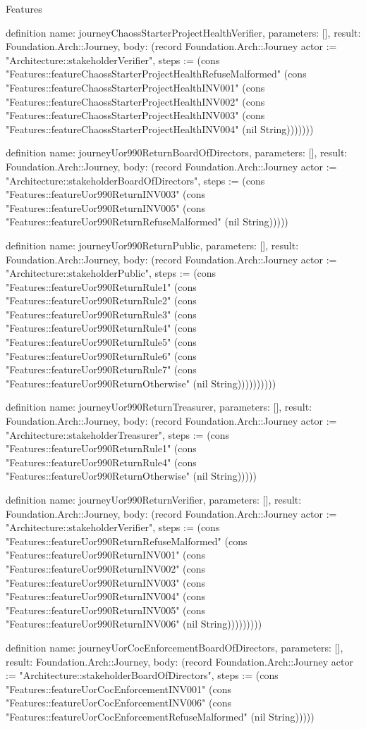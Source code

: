 \begin{lexlean}{Features}
\begin{semanticmodule}
definition{
  name: journeyChaossStarterProjectHealthVerifier,
  parameters: [],
  result: Foundation.Arch::Journey,
  body: (record Foundation.Arch::Journey {actor := "Architecture::stakeholderVerifier", steps := (cons "Features::featureChaossStarterProjectHealthRefuseMalformed" (cons "Features::featureChaossStarterProjectHealthINV001" (cons "Features::featureChaossStarterProjectHealthINV002" (cons "Features::featureChaossStarterProjectHealthINV003" (cons "Features::featureChaossStarterProjectHealthINV004" (nil String))))))})
}

definition{
  name: journeyUor990ReturnBoardOfDirectors,
  parameters: [],
  result: Foundation.Arch::Journey,
  body: (record Foundation.Arch::Journey {actor := "Architecture::stakeholderBoardOfDirectors", steps := (cons "Features::featureUor990ReturnINV003" (cons "Features::featureUor990ReturnINV005" (cons "Features::featureUor990ReturnRefuseMalformed" (nil String))))})
}

definition{
  name: journeyUor990ReturnPublic,
  parameters: [],
  result: Foundation.Arch::Journey,
  body: (record Foundation.Arch::Journey {actor := "Architecture::stakeholderPublic", steps := (cons "Features::featureUor990ReturnRule1" (cons "Features::featureUor990ReturnRule2" (cons "Features::featureUor990ReturnRule3" (cons "Features::featureUor990ReturnRule4" (cons "Features::featureUor990ReturnRule5" (cons "Features::featureUor990ReturnRule6" (cons "Features::featureUor990ReturnRule7" (cons "Features::featureUor990ReturnOtherwise" (nil String)))))))))})
}

definition{
  name: journeyUor990ReturnTreasurer,
  parameters: [],
  result: Foundation.Arch::Journey,
  body: (record Foundation.Arch::Journey {actor := "Architecture::stakeholderTreasurer", steps := (cons "Features::featureUor990ReturnRule1" (cons "Features::featureUor990ReturnRule4" (cons "Features::featureUor990ReturnOtherwise" (nil String))))})
}

definition{
  name: journeyUor990ReturnVerifier,
  parameters: [],
  result: Foundation.Arch::Journey,
  body: (record Foundation.Arch::Journey {actor := "Architecture::stakeholderVerifier", steps := (cons "Features::featureUor990ReturnRefuseMalformed" (cons "Features::featureUor990ReturnINV001" (cons "Features::featureUor990ReturnINV002" (cons "Features::featureUor990ReturnINV003" (cons "Features::featureUor990ReturnINV004" (cons "Features::featureUor990ReturnINV005" (cons "Features::featureUor990ReturnINV006" (nil String))))))))})
}

definition{
  name: journeyUorCocEnforcementBoardOfDirectors,
  parameters: [],
  result: Foundation.Arch::Journey,
  body: (record Foundation.Arch::Journey {actor := "Architecture::stakeholderBoardOfDirectors", steps := (cons "Features::featureUorCocEnforcementINV001" (cons "Features::featureUorCocEnforcementINV006" (cons "Features::featureUorCocEnforcementRefuseMalformed" (nil String))))})
}


\end{semanticmodule}
\end{lexlean}
